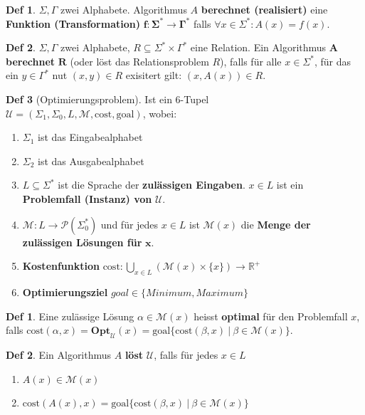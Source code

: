 \documentclass[a4paper, 10pt]{article}
\theoremstyle{definition}
\newtheorem{definition}{Def}[section]
\newtheorem*{definition*}{Def}
\newcommand{\R}{\mathbb{R}}
\newcommand{\words}{\Sigma^*}
\newcommand{\A}{\Sigma}
\newcommand{\op}{\mathcal{U}}
\newcommand{\cost}{\text{cost}}
\newcommand{\opm}{\mathcal{M}}
\newcommand{\goal}{\text{goal}}
\begin{document}
\begin{definition}
    \(\A, \Gamma\) zwei Alphabete. Algorithmus \(A\) \textbf{berechnet (realisiert)} eine \textbf{Funktion (Transformation)} \(\bm{f: \words \to \Gamma^*}\) falls \(\forall x \in \words: A(x) = f(x)\).
\end{definition}

\begin{definition}
    \(\A, \Gamma\) zwei Alphabete, \(R \subseteq \words \times \Gamma^*\) eine Relation. Ein Algorithmus \(\bm{A}\) \textbf{berechnet} \(\bm{R}\) (oder löst das Relationsproblem \(R\)), falls für alle \(x \in \words\), für das ein \(y \in \Gamma^*\) nut \((x, y) \in R\) exisitert gilt: \((x, A(x)) \in R\).
\end{definition}

\begin{definition}[Optimierungsproblem]
    Ist ein 6-Tupel \\
    \(\op = (\A_1, \A_0, L, \opm, \cost, \goal)\), wobei:
    \begin{enumerate}
        \item \(\A_1\) ist das Eingabealphabet
        \item \(\A_2\) ist das Ausgabealphabet
        \item \(L \subseteq \words\) ist die Sprache der \textbf{zulässigen Eingaben}. \(x \in L\) ist ein \textbf{Problemfall (Instanz) von} \(\bm{\op}\).
        \item \(\opm : L \to \mathcal{P}(\words_0)\) und für jedes \(x \in L\) ist \(\opm(x)\) die \textbf{Menge der zulässigen Lösungen für} \(\bm{x}\).
        \item \textbf{Kostenfunktion} \(\cost: \bigcup_{x \in L}(\opm(x) \times \{x\}) \to \R^+\)
        \item \textbf{Optimierungsziel} \(goal \in \{Minimum, Maximum\}\) 
    \end{enumerate}
\end{definition}

\begin{definition*}
    Eine zulässige Lösung \(\alpha \in \opm(x)\) heisst \textbf{optimal} für den Problemfall \(x\), falls \(\cost(\alpha, x) = \textbf{Opt}_\op(x) = \goal\{\cost(\beta, x) \ | \ \beta \in \opm(x)\}\).
\end{definition*}

\begin{definition*}
    Ein Algorithmus \(A\) \textbf{löst} \(\op\), falls für jedes \(x \in L\)
    \begin{enumerate}
        \item \(A(x) \in \opm(x)\)
        \item \(\cost(A(x), x) = \goal\{\cost(\beta, x) \ | \ \beta \in \opm(x)\}\)
    \end{enumerate}
\end{definition*}
\end{document}
